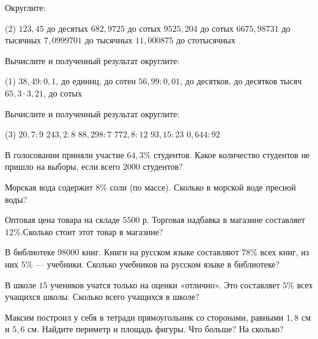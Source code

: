 \begin{exam}
	\begin{listofex}
			\item Округлите: 
			\begin{tasks}(2)
				\task \( 123,45 \) до десятых
				\task \(  682,9725 \) до сотых
				\task \( 9525,204 \) до сотых
				\task \( 6675,98731 \) до тысячных
				\task \( 7,0999701 \) до тысячных
				\task \( 11,000875\) до стотысячных
			\end{tasks}
			\item Вычислите и полученный результат округлите: 
			\begin{tasks}(1)
				\task \( 38,49 : 0,1 \), до единиц, до сотен
				\task \( 56,99 : 0,01  \), до десятков, до десятков тысяч
				\task \( 65,3 \cdot3,21 \), до сотых
			\end{tasks}
			\item Вычислите и полученный результат округлите: 
			\begin{tasks}(3)
				\task \( 20,7 :9 \) 
				\task \( 243,2:8 \)
				\task \( 88,298: 7 \)
				\task \( 772,8:12 \)
				\task \( 93,15: 23 \)
				\task \( 0,644:92 \)
			\end{tasks}
			\item  В голосовании приняли участие \( 64,3\% \) студентов. Какое количество студентов не
			пришло на выборы, если всего \( 2000 \) студентов? 
			\item  Морская вода содержит \( 8\% \) соли (по массе). Сколько в морской воде пресной воды? 
			\item Оптовая цена товара на складе \( 5500 \) р. Торговая надбавка в магазине составляет \( 12\% \).Сколько стоит этот товар в магазине?  
			\item В библиотеке \( 98000  \) книг. Книги на русском языке составляют \( 78\% \) всех книг, из
			них \( 5\% \) --- учебники. Сколько учебников на русском языке в библиотеке?
			\item В школе \( 15 \) учеников учатся только на оценки «отлично». Это составляет \( 5\% \) всех учащихся
			школы. Сколько всего учащихся в школе? 
	\end{listofex}
\end{exam}

\begin{consultation}
	\begin{listofex}
		\item Максим построил у себя в тетради прямоугольник со сторонами, равными \( 1,8 \) см и \( 5,6 \) см. Найдите периметр и площадь фигуры. Что больше? На сколько?
	\end{listofex}
\end{consultation}

